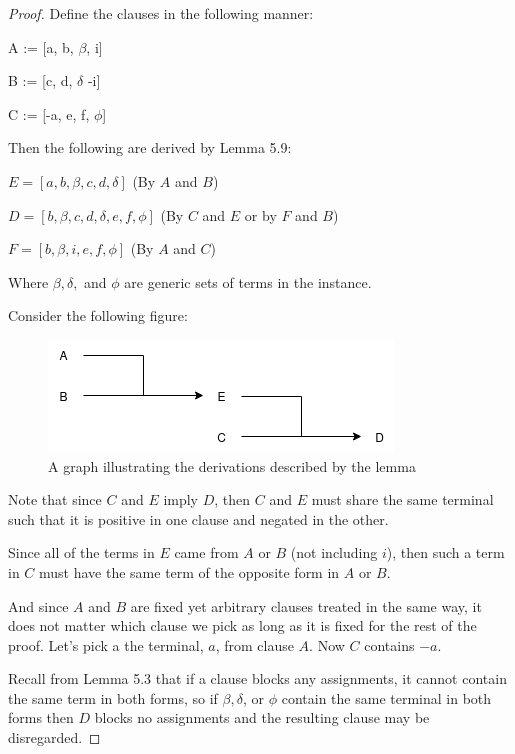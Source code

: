 \documentclass[manuscript]{acmart}
\begin{document}
    \begin{proof}
        
        Define the clauses in the following manner:

        A := [a, b, $\beta$, i]

        B := [c, d, $\delta$ -i]

        C := [-a, e, f, $\phi$]

        Then the following are derived by Lemma 5.9:
        
        $E = [a, b, \beta, c, d, \delta]$ (By $A$ and $B$)

        $D = [b, \beta, c, d, \delta, e, f, \phi]$ (By $C$ and $E$ or by $F$ and $B$)

        $F = [b, \beta, i, e, f, \phi]$ (By $A$ and $C$)

        Where $\beta, \delta, $ and $\phi$ are generic sets of terms in the instance.

        Consider the following figure:    
        
        \begin{figure}[H]
            \includegraphics[scale=0.8]{511a}        
            \caption{A graph illustrating the derivations described by the lemma}
        \end{figure}

        Note that since $C$ and $E$ imply $D$, then $C$ and $E$ must share the same terminal such that it is positive in one clause and negated in the other.
        
        Since all of the terms in $E$ came from $A$ or $B$ (not including $i$), then such a term in $C$ must have the same term of the opposite form in $A$ or $B$.
        
        And since $A$ and $B$ are fixed yet arbitrary clauses treated in the same way, it does not matter which clause we pick as long as it is fixed for the rest of the proof. Let's pick a the terminal, $a$, from clause $A$. Now $C$ contains $-a$.
 
        Recall from Lemma 5.3 that if a clause blocks any assignments, it cannot contain the same term in both forms, so if $\beta, \delta$, or $\phi$ contain the same terminal in both forms then $D$ blocks no assignments and the resulting clause may be disregarded.


\end{proof}
\end{document}
